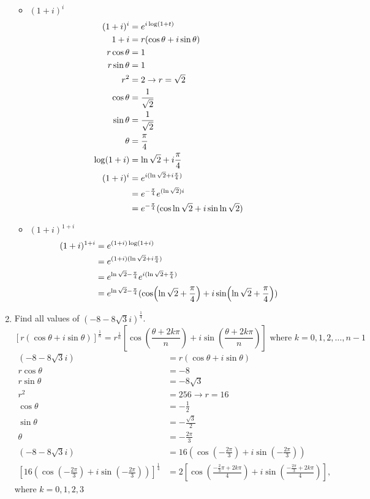 \documentclass[12pt]{article}
\begin{document}
\begin{enumerate}
\begin{itemize}
$$\begin{aligned}
\end{aligned} $$ 
\item $(1+i)^i$
$$ \begin{aligned} 
(1+i)^i &= e^{i\log(1+t)} \\ 1+i &= r(\cos \theta + i\sin \theta) \\ r\cos\theta &= 1\\  r\sin\theta &= 1 \\ r^2 &=2 \to r = \sqrt{2} \\ \cos\theta &= \frac{1}{\sqrt{2}} \\ \sin \theta &= \frac{1}{\sqrt{2}} \\ \theta &= \frac{\pi}{4} \\ \log(1+i) &= \ln \sqrt{2} + i\frac{\pi}{4} \\ (1+i)^i &= e^{i(\ln \sqrt{2} + i\frac{\pi}{4})} \\ &= e^{-\frac{\pi}{4}} e^{(\ln \sqrt{2})i} \\ &= e^{-\frac{\pi}{4}}(\cos \ln\sqrt{2} + i\sin \ln\sqrt{2}) 
\end{aligned} $$ 
\item $(1+i)^{1+i}$
$$ \begin{aligned} 
(1+i)^{1+i} &= e^{(1+i)\log(1+i)} \\ &= e^{(1+i)(\ln \sqrt{2} + i\frac{\pi}{4})} \\ &= e^{\ln\sqrt{2} - \frac{\pi}{4}}e^{i(\ln\sqrt{2} + \frac{\pi}{4})} \\ &= e^{\ln\sqrt{2} - \frac{\pi}{4}} (\cos(\ln\sqrt{2} + \frac{\pi}{4}) + i\sin(\ln\sqrt{2} + \frac{\pi}{4}))
\end{aligned} $$ 
\end{itemize}
\item Find all values of $(-8 -8\sqrt{3}i)^{\frac{1}{4}}$. 
$$ [r(\cos\theta + i\sin \theta)]^\frac{1}{n} = r^{\frac{1}{n}}\left[\cos ( \frac{\theta + 2k\pi}{n}) + i\sin( \frac{\theta + 2k\pi}{n})\right] \text{ where } k = 0,1,2,\dots,n-1 $$
$$ \begin{aligned} 
 (-8-8\sqrt{3}i) &= r(\cos\theta + i\sin\theta) \\ r\cos \theta &= -8 \\ r\sin\theta &= -8\sqrt{3} \\ r^2 &=256 \to r = 16 \\ \cos \theta &= -\frac{1}{2} \\ \sin \theta &= -\frac{\sqrt{3}}{2} \\ \theta &= -\frac{2\pi}{3} \\ (-8-8\sqrt{3}i) &= 16(\cos(-\frac{2\pi}{3}) + i\sin (-\frac{2\pi}{3})) \\ [16(\cos (-\frac{2\pi}{3}) + i\sin (-\frac{2\pi}{3}))]^\frac{1}{4} &= 2[\cos ( \frac{-\frac{2}{3}\pi + 2k\pi}{4}) + i\sin (\frac{-\frac{2\pi}{3} + 2k\pi}{4})], 
\end{aligned} $$ where $k = 0,1,2,3 $
\end{enumerate} 
\end{document}
